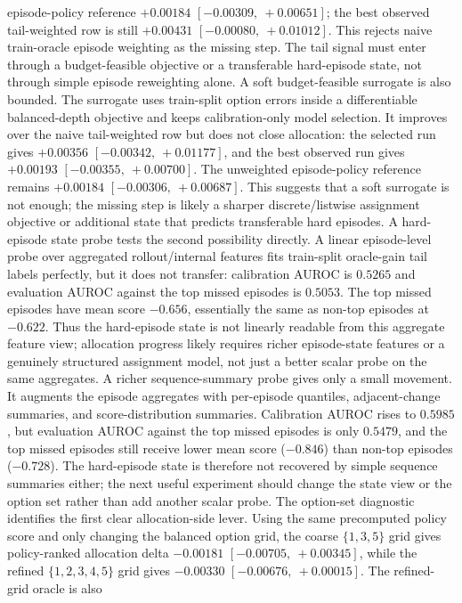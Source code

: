 episode-policy reference $+0.00184$ $[-0.00309,\ +0.00651]$; the best observed
tail-weighted row is still $+0.00431$ $[-0.00080,\ +0.01012]$.  This rejects
naive train-oracle episode weighting as the missing step.  The tail signal must
enter through a budget-feasible objective or a transferable hard-episode state,
not through simple episode reweighting alone.
A soft budget-feasible surrogate is also bounded.  The surrogate uses
train-split option errors inside a differentiable balanced-depth objective and
keeps calibration-only model selection.  It improves over the naive
tail-weighted row but does not close allocation: the selected run gives
$+0.00356$ $[-0.00342,\ +0.01177]$, and the best observed run gives $+0.00193$
$[-0.00355,\ +0.00700]$.  The unweighted episode-policy reference remains
$+0.00184$ $[-0.00306,\ +0.00687]$.  This suggests that a soft surrogate is not
enough; the missing step is likely a sharper discrete/listwise assignment
objective or additional state that predicts transferable hard episodes.
A hard-episode state probe tests the second possibility directly.  A linear
episode-level probe over aggregated rollout/internal features fits
train-split oracle-gain tail labels perfectly, but it does not transfer:
calibration AUROC is $0.5265$ and evaluation AUROC against the top missed
episodes is $0.5053$.  The top missed episodes have mean score $-0.656$,
essentially the same as non-top episodes at $-0.622$.  Thus the hard-episode
state is not linearly readable from this aggregate feature view; allocation
progress likely requires richer episode-state features or a genuinely
structured assignment model, not just a better scalar probe on the same
aggregates.
A richer sequence-summary probe gives only a small movement.  It augments the
episode aggregates with per-episode quantiles, adjacent-change summaries, and
score-distribution summaries.  Calibration AUROC rises to $0.5985$, but
evaluation AUROC against the top missed episodes is only $0.5479$, and the top
missed episodes still receive lower mean score ($-0.846$) than non-top episodes
($-0.728$).  The hard-episode state is therefore not recovered by simple
sequence summaries either; the next useful experiment should change the state
view or the option set rather than add another scalar probe.
The option-set diagnostic identifies the first clear allocation-side lever.
Using the same precomputed policy score and only changing the balanced option
grid, the coarse $\{1,3,5\}$ grid gives policy-ranked allocation delta
$-0.00181$ $[-0.00705,\ +0.00345]$, while the refined $\{1,2,3,4,5\}$ grid
gives $-0.00330$ $[-0.00676,\ +0.00015]$.  The refined-grid oracle is also
